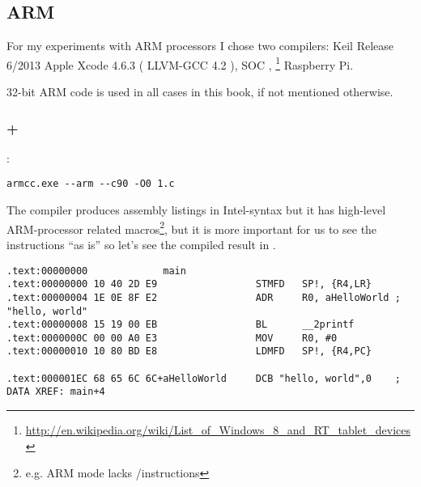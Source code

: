 \subsection{ARM}
\label{sec:hw_ARM}

\index{\idevices}
{For my experiments with ARM processors I chose two compilers}: 
 Keil Release 6/2013 
 Apple Xcode 4.6.3  ( LLVM-GCC 4.2 ), 
 \ac{SOC} \InENRU \idevices, 
\footnote{\url{http://en.wikipedia.org/wiki/List_of_Windows_8_and_RT_tablet_devices}} 
 Raspberry Pi.

{32-bit ARM code is used in all cases in this book, if not mentioned otherwise}.

\subsubsection{\NonOptimizingKeil + \ARMMode}

:

\begin{lstlisting}
armcc.exe --arm --c90 -O0 1.c 
\end{lstlisting}

\index{\IntelSyntax}
{The  compiler produces assembly listings in Intel-syntax} 
{but it has high-level ARM-processor related macros}\footnote{
{e.g. ARM mode lacks \PUSH/\POP instructions}}, 
{but it is more important for us to see the instructions ``as is'' so let's see the compiled result in \IDA}.

\begin{lstlisting}[caption=\NonOptimizingKeil + \ARMMode + \IDA]
.text:00000000             main
.text:00000000 10 40 2D E9                 STMFD   SP!, {R4,LR}
.text:00000004 1E 0E 8F E2                 ADR     R0, aHelloWorld ; "hello, world"
.text:00000008 15 19 00 EB                 BL      __2printf
.text:0000000C 00 00 A0 E3                 MOV     R0, #0
.text:00000010 10 80 BD E8                 LDMFD   SP!, {R4,PC}

.text:000001EC 68 65 6C 6C+aHelloWorld     DCB "hello, world",0    ; DATA XREF: main+4
\end{lstlisting}

